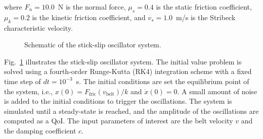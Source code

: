 where $F_n = 10.0$~N is the normal force, $\mu_s = 0.4$ is the static friction coefficient, $\mu_k = 0.2$ is the kinetic friction coefficient, and $v_s = 1.0$~m/s is the Stribeck characteristic velocity. 

\begin{figure}[htbp]
  \centering
  \caption{Schematic of the stick-slip oscillator system.}
  \label{fig:clustering:stick_slip_oscillator}
\end{figure}

Fig.~\ref{fig:clustering:stick_slip_oscillator} illustrates the stick-slip oscillator system. The initial value problem is solved using a fourth-order Runge-Kutta (RK4) integration scheme with a fixed time step of $dt = 10^{-3}$~s. The initial conditions are set the equilibrium point of the system, i.e., $x(0) = F_{\text{fric}}(v_{\text{belt}})/k$ and $\dot{x}(0) = 0$. A small amount of noise is added to the initial conditions to trigger the oscillations. The system is simulated until a steady-state is reached, and the amplitude of the oscillations are computed as a QoI. The input parameters of interest are the belt velocity $v$ and the damping coefficient $c$. 


